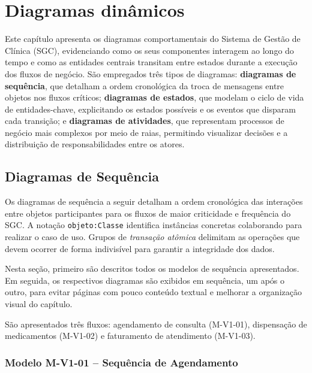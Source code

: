\chapter{Diagramas dinâmicos}

Este capítulo apresenta os diagramas comportamentais do Sistema de Gestão de Clínica (SGC), evidenciando como os seus componentes interagem ao longo do tempo e como as entidades centrais transitam entre estados durante a execução dos fluxos de negócio. São empregados três tipos de diagramas: \textbf{diagramas de sequência}, que detalham a ordem cronológica da troca de mensagens entre objetos nos fluxos críticos; \textbf{diagramas de estados}, que modelam o ciclo de vida de entidades-chave, explicitando os estados possíveis e os eventos que disparam cada transição; e \textbf{diagramas de atividades}, que representam processos de negócio mais complexos por meio de raias, permitindo visualizar decisões e a distribuição de responsabilidades entre os atores.

\section{Diagramas de Sequência}

Os diagramas de sequência a seguir detalham a ordem cronológica das interações entre objetos participantes para os fluxos de maior criticidade e frequência do SGC. A notação \texttt{objeto:Classe} identifica instâncias concretas colaborando para realizar o caso de uso. Grupos de \textit{transação atômica} delimitam as operações que devem ocorrer de forma indivisível para garantir a integridade dos dados.

Nesta seção, primeiro são descritos todos os modelos de sequência apresentados. Em seguida, os respectivos diagramas são exibidos em sequência, um após o outro, para evitar páginas com pouco conteúdo textual e melhorar a organização visual do capítulo.

São apresentados três fluxos: agendamento de consulta (M-V1-01), dispensação de medicamentos (M-V1-02) e faturamento de atendimento (M-V1-03).

\subsection{Modelo M-V1-01 -- Sequência de Agendamento}


